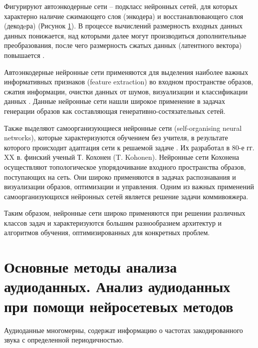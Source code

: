 Фигурируют автоэнкодерные сети -- подкласс нейронных сетей, для которых характерно наличие сжимающего слоя (энкодера) и восстанавлювающего слоя (декодeра) (Рисунок \ref{fig:enc}).
В процессе вычислений размерность входных данных данных понижается, над которыми далее могут производиться дополнительные преобразования, 
после чего размерность сжатых данных (латентного вектора) повышается \cite{vae}.
\begin{figure}[H]
	\caption{}
	\label{fig:enc}
\end{figure}

Автоэнкодерные нейронные сети применяются для выделения наиболее важных информативных признаков 
(feature extraction) во входном пространстве образов, сжатия информации, очистки
данных от шумов, визуализации и классификации данных \cite{bgu_krasn}.
Данные нейронные сети нашли широкое применение в задачах генерации образов как составляющая генеративно-состязательных сетей.

Также выделяют самоорганизующиеся нейронные сети (self-organising neural networks), которые характеризуются обучением без учителя, в результате которого происходит адаптация сети к решаемой задаче . Их разработал в 80-е гг. XX в.
финский ученый Т. Кохонен (T. Kohonen). Нейронные сети
Кохонена осуществляют топологическое упорядочивание входного
пространства образов, поступающих на сеть. Они широко применяются
в задачах распознавания и визуализации образов, оптимизации и
управления. Одним из важных применений самоорганизующихся нейронных сетей является решение задачи коммивояжера.

Таким образом, нейронные сети широко применяются при решении различных классов задач и характеризуются
большим разнообразием архитектур и алгоритмов обучения, оптимизированных для конкретных проблем.

\section{Основные методы анализа аудиоданных. Анализ аудиоданных при помощи нейросетевых методов}
Аудиоданные многомерны, содержат информацию о частотах закодированного звука с 
определенной периодичностью. 

